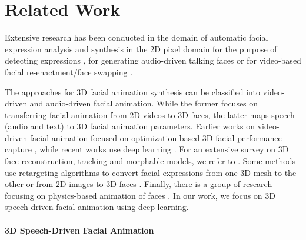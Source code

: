 \documentclass[10pt,twocolumn,letterpaper]{article}
\begin{document}
\section{Related Work}

Extensive research has been conducted in the domain of automatic facial expression analysis and synthesis in the 2D pixel domain for the purpose of detecting expressions \cite{AU1, AU2, AU3}, for generating audio-driven talking faces \cite{talkingFace2, talkingFace3, talkingFace4, Lu2021, talkingFace8} or for video-based facial re-enactment/face swapping \cite{Suwajanakorn2017, Nirkin2019, Perov2020}. 

The approaches for 3D facial animation synthesis can be classified into video-driven and audio-driven facial animation. While the former focuses on transferring facial animation from 2D videos to 3D faces, the latter maps speech (audio and text) to 3D facial animation parameters. Earlier works on video-driven facial animation focused on optimization-based 3D facial performance capture \cite{Bouaziz2013, Cao2014, Ichim2015}, while recent works use deep learning \cite{RingNet:CVPR:2019, DECA:Siggraph2021, Ma2021, EMOCA:CVPR:2021, moser2021}. For an extensive survey on 3D face reconstruction, tracking and morphable models, we refer to \cite{MORALES2021100400, Zollhofer2018, Egger2020}. Some methods use retargeting algorithms to convert facial expressions from one 3D mesh to the other \cite{Ribera:2017, Chandran2022} or from 2D images to 3D faces \cite{Yang2020, Zhang2022}. Finally, there is a group of research focusing on physics-based animation of faces \cite{Ichim2017, Barrielle2018}. In our work, we focus on 3D speech-driven facial animation using deep learning.
\vspace{-1em}


\paragraph{3D Speech-Driven Facial Animation}
\end{document}

